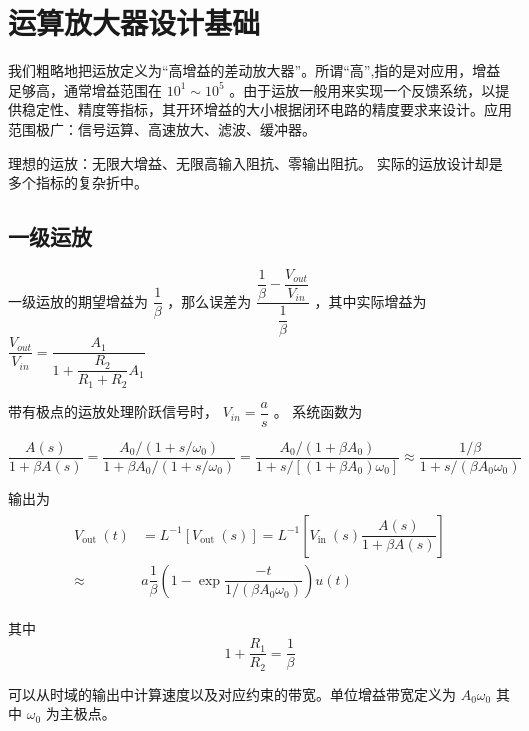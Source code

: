 \documentclass[cn,11pt,chinese,black,simple]{../elegantbook}
\begin{document}
\fi 


\chapter{运算放大器设计基础}

我们粗略地把运放定义为“高增益的差动放大器”。所谓“高”,指的是对应用，增益足够高，通常增益范围在 \( 10^{1} \sim 10^{5} \) 。由于运放一般用来实现一个反馈系统，以提供稳定性、精度等指标，其开环增益的大小根据闭环电路的精度要求来设计。应用范围极广：信号运算、高速放大、滤波、缓冲器。

理想的运放：无限大增益、无限高输入阻抗、零输出阻抗。
实际的运放设计却是多个指标的复杂折中。



\section{一级运放}

一级运放的期望增益为 \(\dfrac{1}{\beta}\) ，那么误差为 \(\dfrac{\dfrac{1}{\beta} - \dfrac{V_{out}}{V_{in}}}{\dfrac{1}{\beta}}\) ，其中实际增益为 \(\dfrac{V_{o u t}}{V_{i n}}=\dfrac{A_{1}}{1+\dfrac{R_{2}}{R_{1}+R_{2}} A_{1}}\)


带有极点的运放处理阶跃信号时， \(V_{in} = \dfrac{a}{s}\) 。
系统函数为

\[ \dfrac{A(s)}{1+\beta A(s)}=\dfrac{A_{0} /\left(1+s / \omega_{0}\right)}{1+\beta A_{0} /\left(1+s / \omega_{0}\right)}=\dfrac{A_{0} /\left(1+\beta A_{0}\right)}{1+s /\left[\left(1+\beta A_{0}\right) \omega_{0}\right]} \approx \dfrac{1 / \beta}{1+s /\left(\beta A_{0} \omega_{0}\right)} \]

输出为 \[
    \begin{array}{l}
        \begin{aligned}
            
            V_{\text {out }}(t) &= L ^{-1}\left[V_{\text {out }}(s)\right]= L ^{-1}\left[V_{\text {in }}(s) \dfrac{A(s)}{1+\beta A(s)}\right] \\
            \approx & a \dfrac{1}{\beta}\left(1-\exp \dfrac{-t}{1 /\left(\beta A_{0} \omega_{0}\right)}\right) u(t) 
        \end{aligned}
    \end{array}    
\]

其中 \[1+\dfrac{R_{1}}{R_{2}}=\dfrac{1}{\beta}\]

可以从时域的输出中计算速度以及对应约束的带宽。单位增益带宽定义为 \(A_0 \omega_0\) 其中 \(\omega_0\) 为主极点。
\end{document}
